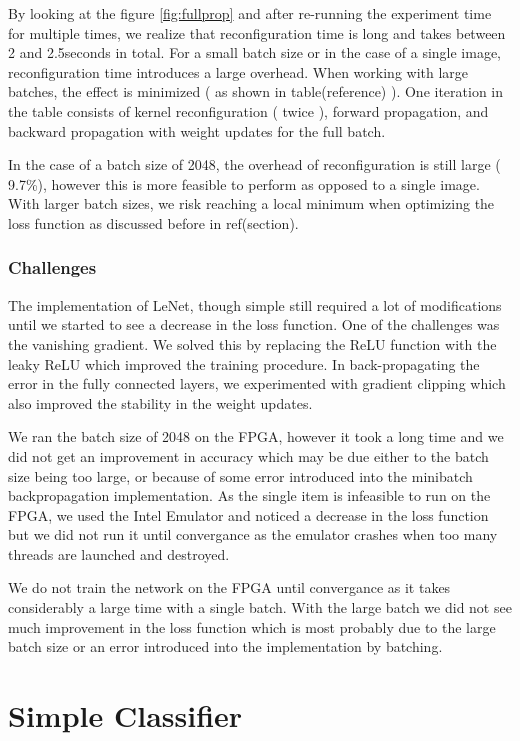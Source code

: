 By looking at the figure \ref{fig:fullprop} and after re-running the experiment time for multiple times, we realize that reconfiguration time is long and takes between 2 and 2.5seconds in total. For a small batch size or in the case of a single image, reconfiguration time introduces a large overhead. When working with large batches, the effect is minimized ( as shown in table(reference) ). One iteration in the table consists of kernel reconfiguration ( twice ), forward propagation, and backward propagation with weight updates for the full batch.

In the case of a batch size of 2048, the overhead of reconfiguration is still large ( 9.7\%), however this is more feasible to perform as opposed to a single image. With larger batch sizes, we risk reaching a local minimum when optimizing the loss function as discussed before in ref(section).

\subsubsection{Challenges}

The implementation of LeNet, though simple still required a lot of modifications until we started to see a decrease in the loss function. One of the challenges was the vanishing gradient. We solved this by replacing the ReLU function with the leaky ReLU which improved the training procedure. In back-propagating the error in the fully connected layers, we experimented with gradient clipping which also improved the stability in the weight updates. 

We ran the batch size of 2048 on the FPGA, however it took a long time and we did not get an improvement in accuracy which may be due either to the batch size being too large, or because of some error introduced into the minibatch backpropagation implementation. As the single item is infeasible to run on the FPGA, we used the Intel Emulator and noticed a decrease in the loss function but we did not run it until convergance as the emulator crashes when too many threads are launched and destroyed. 

We do not train the network on the FPGA until convergance as it takes considerably a large time with a single batch. With the large batch we did not see much improvement in the loss function which is most probably due to the large batch size or an error introduced into the implementation by batching. 


\section{Simple Classifier}

